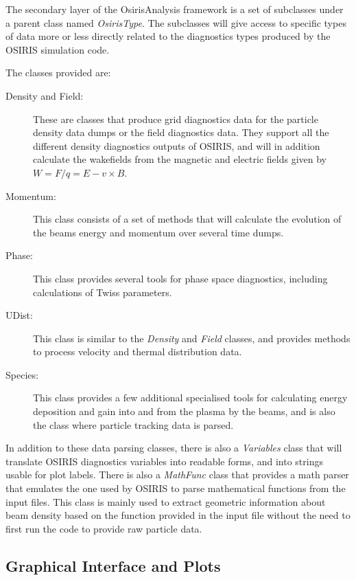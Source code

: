 The secondary layer of the OsirisAnalysis framework is a set of subclasses under a parent class named \emph{OsirisType}.
The subclasses will give access to specific types of data more or less directly related to the diagnostics types produced by the OSIRIS simulation code.

The classes provided are:

\begin{description}
    \item[Density and Field:] These are classes that produce grid diagnostics data for the particle density data dumps or the field diagnostics data.
    They support all the different density diagnostics outputs of OSIRIS, and will in addition calculate the wakefields from the magnetic and electric fields given by $W = F/q = E - v \times B$.
    \item[Momentum:] This class consists of a set of methods that will calculate the evolution of the beams energy and momentum over several time dumps.
    \item[Phase:] This class provides several tools for phase space diagnostics, including calculations of Twiss parameters.
    \item[UDist:] This class is similar to the \emph{Density} and \emph{Field} classes, and provides methods to process velocity and thermal distribution data.
    \item[Species:] This class provides a few additional specialised tools for calculating energy deposition and gain into and from the plasma by the beams, and is also the class where particle tracking data is parsed.
\end{description}

In addition to these data parsing classes, there is also a \emph{Variables} class that will translate OSIRIS diagnostics variables into readable forms, and into strings usable for plot labels.
There is also a \emph{MathFunc} class that provides a math parser that emulates the one used by OSIRIS to parse mathematical functions from the input files.
This class is mainly used to extract geometric information about beam density based on the function provided in the input file without the need to first run the code to provide raw particle data.

\subsection{Graphical Interface and Plots}
\label{Tools:OALay3}

